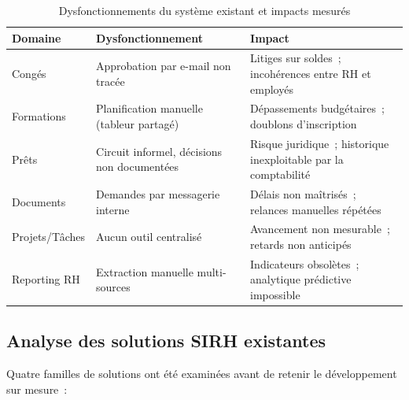 \begin{table}[H]
\centering
\caption{Dysfonctionnements du système existant et impacts mesurés}
\label{tab:critique}
\begin{tabularx}{\textwidth}{|l|L|L|}
\hline
{}\textbf{Domaine} & \textbf{Dysfonctionnement} & \textbf{Impact} \\\hline
{}
Congés & Approbation par e-mail non tracée &
  Litiges sur soldes~; incohérences entre RH et employés \\\hline
Formations & Planification manuelle (tableur partagé) &
  Dépassements budgétaires~; doublons d'inscription \\\hline
{}
Prêts & Circuit informel, décisions non documentées &
  Risque juridique~; historique inexploitable par la comptabilité \\\hline
Documents & Demandes par messagerie interne &
  Délais non maîtrisés~; relances manuelles répétées \\\hline
{}
Projets/Tâches & Aucun outil centralisé &
  Avancement non mesurable~; retards non anticipés \\\hline
Reporting RH & Extraction manuelle multi-sources &
  Indicateurs obsolètes~; analytique prédictive impossible \\\hline
\end{tabularx}
\end{table}

\subsection{Analyse des solutions SIRH existantes}

Quatre familles de solutions ont été examinées avant de retenir le développement
sur mesure~:

